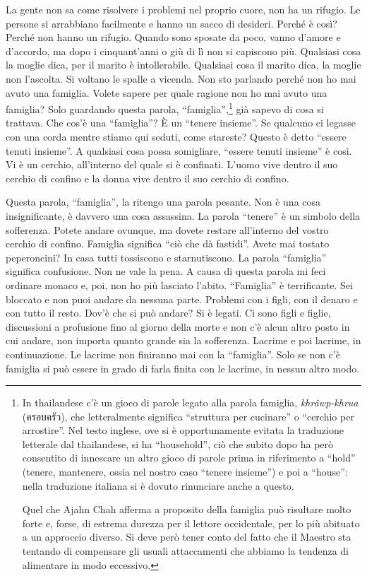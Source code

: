 La gente non sa come risolvere i problemi nel proprio cuore, non ha un
rifugio. Le persone si arrabbiano facilmente e hanno un sacco di
desideri. Perché è così? Perché non hanno un rifugio. Quando sono
sposate da poco, vanno d'amore e d'accordo, ma dopo i cinquant'anni o
giù di lì non si capiscono più. Qualsiasi cosa la moglie dica, per il
marito è intollerabile. Qualsiasi cosa il marito dica, la moglie non
l'ascolta. Si voltano le spalle a vicenda. Non sto parlando perché non
ho mai avuto una famiglia. Volete sapere per quale ragione non ho mai
avuto una famiglia? Solo guardando questa parola,
``famiglia'',\footnote{In thailandese c'è un gioco di parole legato alla
  parola famiglia, \emph{khrâwp-khrua} (ครอบครัว), che letteralmente
  significa ``struttura per cucinare'' o ``cerchio per arrostire''. Nel
  testo inglese, ove si è opportunamente evitata la traduzione letterale
  dal thailandese, si ha ``household'', ciò che subito dopo ha però
  consentito di innescare un altro gioco di parole prima in riferimento
  a ``hold'' (tenere, mantenere, ossia nel nostro caso ``tenere
  insieme'') e poi a ``house'': nella traduzione italiana si è dovuto
  rinunciare anche a questo.

  Quel che Ajahn Chah afferma a proposito della famiglia può risultare
  molto forte e, forse, di estrema durezza per il lettore occidentale,
  per lo più abituato a un approccio diverso. Si deve però tener conto
  del fatto che il Maestro sta tentando di compensare gli usuali
  attaccamenti che abbiamo la tendenza di alimentare in modo eccessivo.}
già sapevo di cosa si trattava. Che cos'è una ``famiglia''? È un
``tenere insieme''. Se qualcuno ci legasse con una corda mentre stiamo
qui seduti, come stareste? Questo è detto ``essere tenuti insieme''. A
qualsiasi cosa possa somigliare, ``essere tenuti insieme'' è così. Vi è
un cerchio, all'interno del quale si è confinati. L'uomo vive dentro il
suo cerchio di confino e la donna vive dentro il suo cerchio di confino.

Questa parola, ``famiglia'', la ritengo una parola pesante. Non è una
cosa insignificante, è davvero una cosa assassina. La parola ``tenere''
è un simbolo della sofferenza. Potete andare ovunque, ma dovete restare
all'interno del vostro cerchio di confino. Famiglia significa ``ciò che
dà fastidi''. Avete mai tostato peperoncini? In casa tutti tossiscono e
starnutiscono. La parola ``famiglia'' significa confusione. Non ne vale
la pena. A causa di questa parola mi feci ordinare monaco e, poi, non ho
più lasciato l'abito. ``Famiglia'' è terrificante. Sei bloccato e non
puoi andare da nessuna parte. Problemi con i figli, con il denaro e con
tutto il resto. Dov'è che si può andare? Si è legati. Ci sono figli e
figlie, discussioni a profusione fino al giorno della morte e non c'è
alcun altro posto in cui andare, non importa quanto grande sia la
sofferenza. Lacrime e poi lacrime, in continuazione. Le lacrime non
finiranno mai con la ``famiglia''. Solo se non c'è famiglia si può
essere in grado di farla finita con le lacrime, in nessun altro modo.

